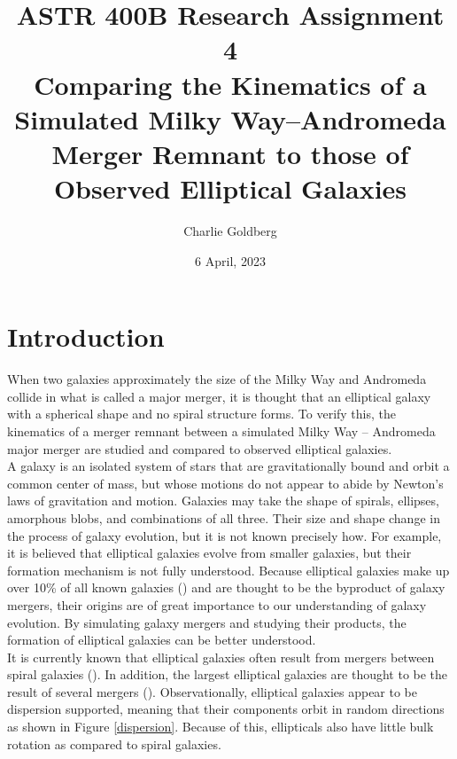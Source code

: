 \documentclass[twocolumn]{aastex63}
\begin{document}
\title{ASTR 400B Research Assignment 4 \\
Comparing the Kinematics of a Simulated Milky Way--Andromeda Merger Remnant to those of Observed Elliptical Galaxies}

\author[0000-0002-4901-7693]{Charlie Goldberg}


\date{6 April, 2023}


\section{Introduction}

When two galaxies approximately the size of the Milky Way and Andromeda collide in what is called a major merger, it is thought that an elliptical galaxy with a spherical shape and no spiral structure forms. To verify this, the kinematics of a merger remnant between a simulated Milky Way -- Andromeda major merger are studied and compared to observed elliptical galaxies.\\

A galaxy is an isolated system of stars that are gravitationally bound and orbit a common center of mass, but whose motions do not appear to abide by Newton's laws of gravitation and motion. Galaxies may take the shape of spirals, ellipses, amorphous blobs, and combinations of all three. Their size and shape change in the process of galaxy evolution, but it is not known precisely how. For example, it is believed that elliptical galaxies evolve from smaller galaxies, but their formation mechanism is not fully understood. Because elliptical galaxies make up over 10\% of all known galaxies (\cite{1996MNRAS.278.1025L}) and are thought to be the byproduct of galaxy mergers, their origins are of great importance to our understanding of galaxy evolution. By simulating galaxy mergers and studying their products, the formation of elliptical galaxies can be better understood.\\

It is currently known that elliptical galaxies often result from mergers between spiral galaxies (\cite{2006ApJ...650..791C}). In addition, the largest elliptical galaxies are thought to be the result of several mergers (\cite{2006ApJ...650..791C}). Observationally, elliptical galaxies appear to be dispersion supported, meaning that their components orbit in random directions as shown in Figure \ref{dispersion}. Because of this, ellipticals also have little bulk rotation as compared to spiral galaxies.\\
\end{document}
